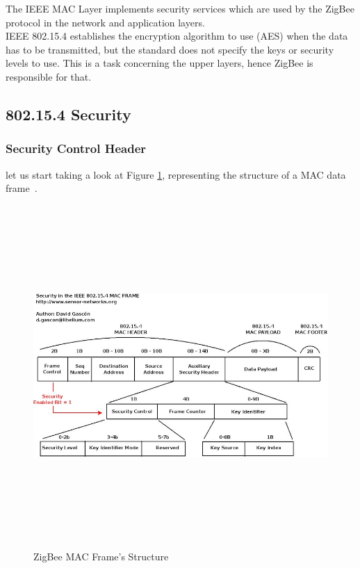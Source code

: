 \documentclass[12pt]{report}
\begin{document}
The IEEE MAC Layer implements security services which are used by the ZigBee protocol in the network and application layers.\\ 
IEEE 802.15.4 establishes the encryption algorithm to use (AES) when the data has to be transmitted, but the standard does not specify the keys or security levels to use.
This is a task concerning the upper layers, hence ZigBee is responsible for that.

\subsection{802.15.4 Security}
\bigskip

\subsubsection{Security Control Header}
\bigskip
let us start taking a look at Figure \ref{fig:zigbeemacframestruc}, representing the structure of a MAC data frame~\cite{security802154}.\\

\begin{figure}[H]
\includegraphics[width=13cm,height=13cm,keepaspectratio]{mac_frame}
\centering
\caption{ZigBee MAC Frame's Structure}
\label{fig:zigbeemacframestruc}
\end{figure}
\end{document}
